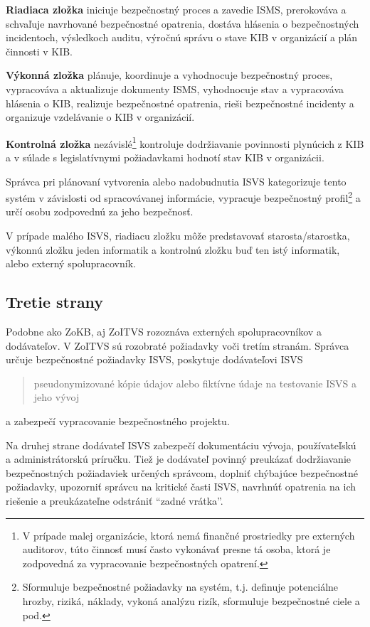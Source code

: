 \textbf{Riadiaca zložka} iniciuje bezpečnostný proces a zavedie \acrshort{ISMS}, prerokováva a schvaľuje
navrhované bezpečnostné opatrenia, dostáva hlásenia o bezpečnostných incidentoch, výsledkoch auditu, výročnú správu o stave
\acrshort{KIB} v organizácií a plán činnosti v \acrshort{KIB}.

\textbf{Výkonná zložka} plánuje, koordinuje a vyhodnocuje bezpečnostný proces, vypracováva a aktualizuje
dokumenty \acrshort{ISMS}, vyhodnocuje stav a vypracováva hlásenia o \acrshort{KIB}, realizuje bezpečnostné opatrenia,
rieši bezpečnostné incidenty a organizuje vzdelávanie o \acrshort{KIB} v organizácií.

\textbf{Kontrolná zložka} nezávislé\footnote{V prípade malej organizácie, ktorá nemá finančné prostriedky pre externých
auditorov, túto činnosť musí často vykonávať presne tá osoba, ktorá je zodpovedná za vypracovanie bezpečnostných opatrení.}
kontroluje dodržiavanie povinnosti plynúcich z \acrshort{KIB} a v súlade s legislatívnymi požiadavkami hodnotí stav \acrshort{KIB}
v organizácii.

Správca pri plánovaní vytvorenia alebo nadobudnutia \acrshort{ISVS} kategorizuje tento systém v závislosti od spracovávanej
informácie, vypracuje bezpečnostný profil\footnote{Sformuluje bezpečnostné požiadavky na systém, t.j. definuje potenciálne
hrozby, riziká, náklady, vykoná analýzu rizík, sformuluje bezpečnostné ciele a pod.} a určí osobu zodpovednú za jeho bezpečnosť.

V prípade malého ISVS, riadiacu zložku môže predstavovať starosta/starostka, výkonnú zložku jeden informatik a kontrolnú
zložku buď ten istý informatik, alebo externý spolupracovník.

\subsection{Tretie strany}
Podobne ako ZoKB, aj ZoITVS rozoznáva externých spolupracovníkov a dodávateľov. V \cite[\S 20]{95/2019} ZoITVS sú rozobraté
požiadavky voči tretím stranám. Správca určuje bezpečnostné požiadavky \acrshort{ISVS}, poskytuje
dodávateľovi ISVS\cite[\S 20 ods. (1) písm b)]{95/2019} \blockquote{pseudonymizované kópie údajov alebo fiktívne
údaje na testovanie ISVS a jeho vývoj} a zabezpečí vypracovanie bezpečnostného projektu.

Na druhej strane dodávateľ \acrshort{ISVS} zabezpečí dokumentáciu vývoja, používateľskú a administrátorskú príručku. Tiež
je dodávateľ povinný preukázať dodržiavanie bezpečnostných požiadaviek určených správcom, doplniť chýbajúce bezpečnostné
požiadavky, upozorniť správcu na kritické časti \acrshort{ISVS}, navrhnúť opatrenia na ich riešenie a preukázateľne odstrániť
\enquote{zadné vrátka}.


